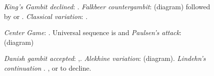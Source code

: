 \begin{figure}[H]
\begin{minipage}[b]{.196\linewidth}
\begin{framed}
\raggedright
\newgame
\emph{King's Gambit declined}: .
\emph{Falkbeer countergambit}:  (diagram) followed by  or .
\emph{Classical variation}: .
\begin{center}
\scalebox{.560}{\showboard}
\end{center}
\end{framed}
\end{minipage}
\begin{minipage}[b]{.196\linewidth}
\begin{framed}
\raggedright
\newgame
\emph{Center Game}: .
Universal sequence is  and \emph{Paulsen's attack}:  (diagram)
\begin{center}
\scalebox{.560}{\showboard}
\end{center}
\end{framed}
\end{minipage}
\begin{minipage}[b]{.196\linewidth}
\begin{framed}
\raggedright
\newgame
\emph{Danish gambit accepted}: ,.
\emph{Alekhine variation}:  (diagram).
\emph{Lindehn's continuation} .
,  or  to decline.
\begin{center}
\scalebox{.560}{\showboard}
\end{center}
\end{framed}
\end{minipage}
\end{figure}

